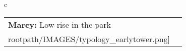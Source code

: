 \begin{table}[H]
        \begin{tabular}{c}
        \begin{tabular}{m{1.5in} m{2in}}
\textbf{Marcy:} {Low-rise in the park} & \texttt{[image: \\rootpath/IMAGES/typology\_earlytower.png]}
\end{tabular}\end{tabular}
        \end{table}